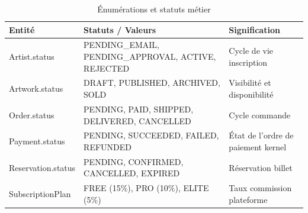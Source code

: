\begin{table}[h]
  \centering
  \caption{Énumérations et statuts métier}
  \label{tab:enums}
  \begin{tabular}{@{}llp{7cm}@{}}
    \toprule
    \textbf{Entité} & \textbf{Statuts / Valeurs} & \textbf{Signification} \\
    \midrule
    Artist.status & PENDING\_EMAIL, PENDING\_APPROVAL, ACTIVE, REJECTED & Cycle de vie inscription \\
    Artwork.status & DRAFT, PUBLISHED, ARCHIVED, SOLD & Visibilité et disponibilité \\
    Order.status & PENDING, PAID, SHIPPED, DELIVERED, CANCELLED & Cycle commande \\
    Payment.status & PENDING, SUCCEEDED, FAILED, REFUNDED & État de l'ordre de paiement kernel \\
    Reservation.status & PENDING, CONFIRMED, CANCELLED, EXPIRED & Réservation billet \\
    SubscriptionPlan & FREE (15\%), PRO (10\%), ELITE (5\%) & Taux commission plateforme \\
    \bottomrule
  \end{tabular}
\end{table}
